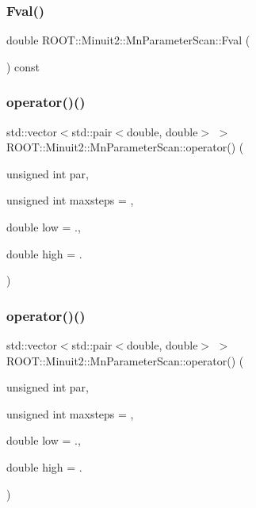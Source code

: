 \subsubsection{\texorpdfstring{Fval()}{Fval()}\hspace{0.1cm}{\footnotesize\ttfamily [3/3]}}
{\footnotesize\ttfamily double R\+O\+O\+T\+::\+Minuit2\+::\+Mn\+Parameter\+Scan\+::\+Fval (\begin{DoxyParamCaption}{ }\end{DoxyParamCaption}) const\hspace{0.3cm}{\ttfamily [inline]}}

\mbox{\label{classROOT_1_1Minuit2_1_1MnParameterScan_aea28c9f299305c9ee1a0f5ad4b44a4e3}} 
\subsubsection{\texorpdfstring{operator()()}{operator()()}\hspace{0.1cm}{\footnotesize\ttfamily [1/3]}}
{\footnotesize\ttfamily std\+::vector$<$std\+::pair$<$double, double$>$ $>$ R\+O\+O\+T\+::\+Minuit2\+::\+Mn\+Parameter\+Scan\+::operator() (\begin{DoxyParamCaption}\item[{unsigned int}]{par,  }\item[{unsigned int}]{maxsteps = {},  }\item[{double}]{low = {.},  }\item[{double}]{high = {.} }\end{DoxyParamCaption})}

\mbox{\label{classROOT_1_1Minuit2_1_1MnParameterScan_aea28c9f299305c9ee1a0f5ad4b44a4e3}} 
\subsubsection{\texorpdfstring{operator()()}{operator()()}\hspace{0.1cm}{\footnotesize\ttfamily [2/3]}}
{\footnotesize\ttfamily std\+::vector$<$std\+::pair$<$double, double$>$ $>$ R\+O\+O\+T\+::\+Minuit2\+::\+Mn\+Parameter\+Scan\+::operator() (\begin{DoxyParamCaption}\item[{unsigned int}]{par,  }\item[{unsigned int}]{maxsteps = {},  }\item[{double}]{low = {.},  }\item[{double}]{high = {.} }\end{DoxyParamCaption})}

